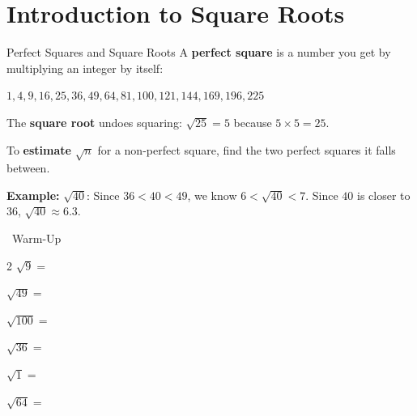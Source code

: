 \section{Introduction to Square Roots}

\begin{quickReview}{Perfect Squares and Square Roots}
A \textbf{perfect square} is a number you get by multiplying an integer by itself:

$1, 4, 9, 16, 25, 36, 49, 64, 81, 100, 121, 144, 169, 196, 225$

The \textbf{square root} undoes squaring: $\sqrt{25} = 5$ because $5 \times 5 = 25$.

\medskip
To \textbf{estimate} $\sqrt{n}$ for a non-perfect square, find the two perfect squares it falls between.

\textbf{Example:} $\sqrt{40}$: Since $36 < 40 < 49$, we know $6 < \sqrt{40} < 7$. Since $40$ is closer to $36$, $\sqrt{40} \approx 6.3$.
\end{quickReview}

\begin{practiceBox}[funGreen]{\faSun~Warm-Up}


\begin{multicols}{2}
\prob $\sqrt{9} =$ \answerBlank[2cm]

\prob $\sqrt{49} =$ \answerBlank[2cm]

\prob $\sqrt{100} =$ \answerBlank[2cm]

\prob $\sqrt{36} =$ \answerBlank[2cm]

\prob $\sqrt{1} =$ \answerBlank[2cm]

\prob $\sqrt{64} =$ \answerBlank[2cm]
\end{multicols}
\end{practiceBox}

